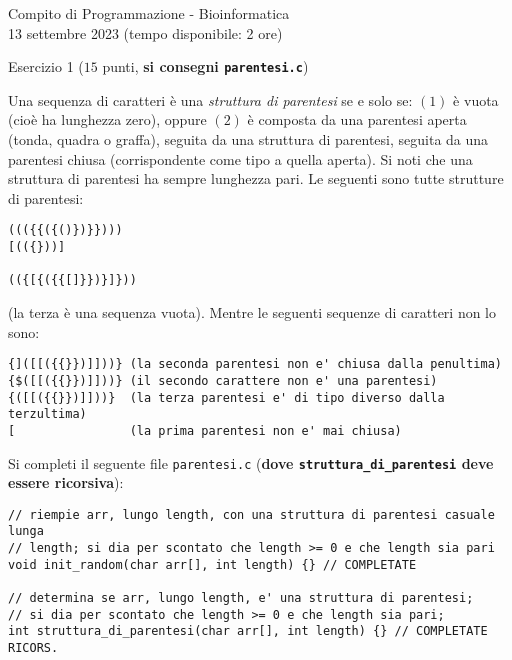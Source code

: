 \documentclass[12pt]{article}
\begin{document}
\begin{center}
  {\LARGE Compito di Programmazione - Bioinformatica}\\
  {13 settembre 2023 (tempo disponibile: 2 ore)}
\end{center}

\begin{center}
  Esercizio 1 ($15$ punti, \textbf{si consegni \texttt{parentesi.c}})
\end{center}

Una sequenza di caratteri \`e una \emph{struttura di parentesi} se e solo se:
$(1)$ \`e vuota (cio\`e ha lunghezza zero), oppure $(2)$
\`e composta da una parentesi aperta (tonda, quadra o graffa), seguita da una struttura
  di parentesi, seguita da una parentesi chiusa (corrispondente come tipo a quella aperta).
Si noti che una struttura di parentesi ha sempre lunghezza pari.
Le seguenti sono tutte strutture di parentesi:
%
\begin{mdframed}[backgroundcolor=verylightgray] 
\begin{verbatim}
((({{({()})}})))
[(({}))]

(({[{({{[]}})}]}))
\end{verbatim}
\end{mdframed}
%
(la terza \`e una sequenza vuota).
Mentre le seguenti sequenze di caratteri non lo sono:
%
\begin{mdframed}[backgroundcolor=verylightgray] 
\begin{verbatim}
{]([[({{}})]]))} (la seconda parentesi non e' chiusa dalla penultima)
{$([[({{}})]]))} (il secondo carattere non e' una parentesi)
{([[({{}})]]))}  (la terza parentesi e' di tipo diverso dalla terzultima)
[                (la prima parentesi non e' mai chiusa)
\end{verbatim}
\end{mdframed}
%
Si completi il seguente file \texttt{parentesi.c} (\textbf{dove
\texttt{struttura\_di\_parentesi} deve essere ricorsiva}):
%
\begin{center}
  \vspace*{-0.8ex}
  \begin{lstlisting}[language=myC]
// riempie arr, lungo length, con una struttura di parentesi casuale lunga
// length; si dia per scontato che length >= 0 e che length sia pari
void init_random(char arr[], int length) {} // COMPLETATE

// determina se arr, lungo length, e' una struttura di parentesi;
// si dia per scontato che length >= 0 e che length sia pari;
int struttura_di_parentesi(char arr[], int length) {} // COMPLETATE RICORS.
  \end{lstlisting}
\end{center}
\end{document}
